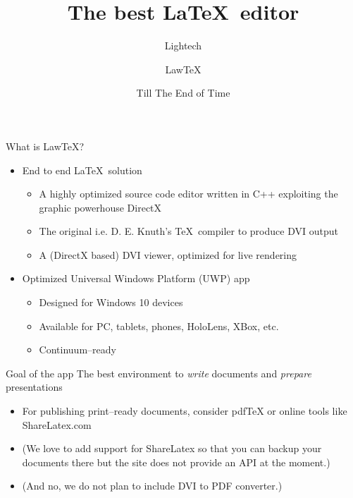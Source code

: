 \documentclass{beamer}
\title{The best \LaTeX\ editor}
\author{Lightech \and LawTeX}
\date{Till The End of Time} %
\begin{document}
\maketitle

\begin{frame}{What is LawTeX?}
\begin{itemize}
\item End to end \LaTeX\ solution
\begin{itemize}
\item A highly optimized source code editor written in C++ exploiting the graphic powerhouse DirectX
\item The original i.e. D. E. Knuth's \TeX\ compiler to produce DVI output
\item A (DirectX based) DVI viewer, optimized for live rendering
\end{itemize}
\item Optimized Universal Windows Platform (UWP) app
\begin{itemize}
\item Designed for Windows 10 devices
\item Available for PC, tablets, phones, HoloLens, XBox, etc.
\item Continuum--ready
\end{itemize}
\end{itemize}
\end{frame}

\begin{frame}{Goal of the app}
The best environment to \emph{write} documents and \emph{prepare} presentations
\begin{itemize}
\item For publishing print--ready documents, consider pdfTeX or online tools like ShareLatex.com
\item (We love to add support for ShareLatex so that you can backup your documents there but the site does not provide an API at the moment.)
\item (And no, we do not plan to include DVI to PDF converter.)
\end{itemize}
\end{frame}
\end{document}
